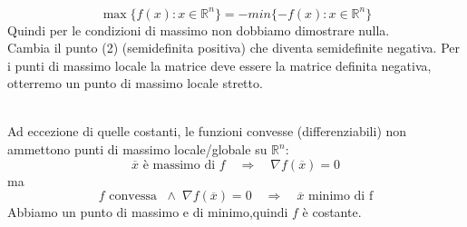 \begin{thproof}

\end{thproof}

\begin{observation}
 $$\max \{ f(x): x \in \mathbb{R}^{n}\} = -min \{  -f(x): x \in \mathbb{R}^{n} \}$$
Quindi per le condizioni di massimo non dobbiamo dimostrare nulla.\\
Cambia il punto (2) (semidefinita positiva) che diventa semidefinite negativa.
Per i punti di massimo locale la matrice deve essere la matrice definita negativa, otterremo
un punto di massimo locale stretto. \\ \\
\end{observation}

\begin{observation}
Ad eccezione di quelle costanti, le funzioni convesse
 (differenziabili) non ammettono punti di massimo locale/globale
su $\mathbb{R}^{n}$:
$$ \overline{x} \text{ \`e massimo di } f
\quad \Longrightarrow \quad
\nabla f(\overline{x}) = 0
$$
ma
$$
f \text{ convessa } \; \wedge \;
\nabla f(\overline{x}) = 0 
\quad \Longrightarrow \quad 
\overline{x} \text{ minimo di f} $$
Abbiamo un punto di massimo e di minimo,quindi
$f$ \`e costante.
\end{observation}

